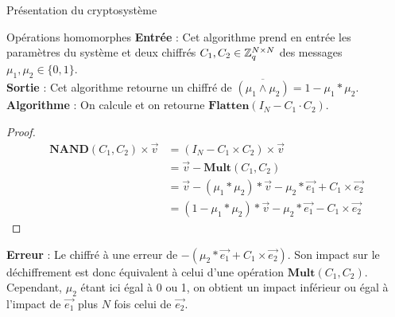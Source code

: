 \begin{section}{Présentation du cryptosystème}
\begin{subsection}{Opérations homomorphes}
	\textbf{Entrée} : Cet algorithme prend en entrée les paramètres du système et deux chiffrés $C_1, C_2 \in \mathbb{Z}_q^{N \times N}$ des messages $\mu_1, \mu_2 \in \{ 0,1\}$.\\
	\textbf{Sortie} : Cet algorithme retourne un chiffré de $\overline{(\mu_1 \land \mu_2)} = 1 - \mu_1 * \mu_2$. \\
	\textbf{Algorithme} : On calcule et on retourne $\textbf{Flatten}(I_N - C_1 \cdot C_2)$.
	\begin{proof}
	\begin{align*}
	\textbf{NAND}(C_1, C_2) \times \vec{v} &= (I_N - C_1 \times C_2) \times \vec{v} \\
	&= \vec{v} - \textbf{Mult}(C_1, C_2) \\
	&= \vec{v} - (\mu_1 * \mu_2) * \vec{v} - \mu_2 * \vec{e_1} + C_1 \times \vec{e_2} \\
	&= (1 - \mu_1 * \mu_2) * \vec{v} - \mu_2 * \vec{e_1} - C_1 \times \vec{e_2}
	\end{align*}
	\end{proof}
	\textbf{Erreur} : Le chiffré à une erreur de $-(\mu_2 * \vec{e_1} + C_1 \times \vec{e_2})$. Son impact sur le déchiffrement est donc équivalent à celui d'une opération $\textbf{Mult}(C_1, C_2)$. Cependant, $\mu_2$ étant ici égal à 0 ou 1, on obtient un impact inférieur ou égal à l'impact de $\vec{e_1}$ plus $N$ fois celui de $\vec{e_2}$.
	
	\end{subsection}
\end{section}
